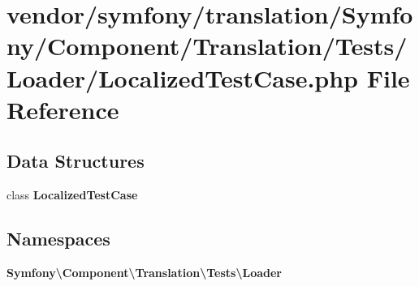 \section{vendor/symfony/translation/\+Symfony/\+Component/\+Translation/\+Tests/\+Loader/\+Localized\+Test\+Case.php File Reference}
\label{_localized_test_case_8php}
\subsection*{Data Structures}
\begin{DoxyCompactItemize}
\item 
class {\bf Localized\+Test\+Case}
\end{DoxyCompactItemize}
\subsection*{Namespaces}
\begin{DoxyCompactItemize}
\item 
 {\bf Symfony\textbackslash{}\+Component\textbackslash{}\+Translation\textbackslash{}\+Tests\textbackslash{}\+Loader}
\end{DoxyCompactItemize}
